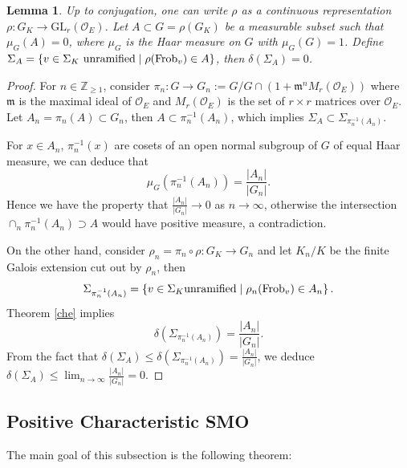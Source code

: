 \documentclass[20pt, oneside]{article}   	%
\newtheorem{lem}[thm]{Lemma}
\theoremstyle{definition}
\newcommand{\GL}{\mathrm{GL}}
\newcommand{\cO}{\mathcal{O}}
\begin{document}
\begin{lem}\label{lema}
Up to conjugation, one can write $\rho$ as a continuous representation $\rho:G_K\rightarrow \GL_r(\cO_E)$. Let $A\subset G=\rho(G_K)$ be a measurable subset such that $\mu_G(A)=0$, where $\mu_G$ is the Haar measure on $G$ with $\mu_G(G)=1$. Define $\Sigma_A=\left\{v\in\Sigma_K\ {\rm unramified }\mid \rho({\rm Frob}_v)\in A\right\}$, then $\delta(\Sigma_A)=0$.
\end{lem}
\begin{proof}

For $n\in \mathbb{Z}_{\geqslant 1}$, consider $\pi_n:G\rightarrow G_n:=G/G\cap (1+\mathfrak{m}^n M_r(\cO_E))$ where $\mathfrak{m}$ is the maximal ideal of $\cO_E$ and $M_r(\cO_E)$ is the set of $r\times r$ matrices over $\cO_E$. Let $A_n=\pi_n(A)\subset G_n$, then $A\subset\pi_n^{-1}(A_n)$, which implies $\Sigma_A\subset\Sigma_{\pi_n^{-1}(A_n)}$.

For $x\in A_n$, $\pi_n^{-1}(x)$ are cosets of an open normal subgroup of $G$ of equal Haar measure, we can deduce that $$\mu_G(\pi_n^{-1}(A_n))=\frac{|A_n|}{|G_n|}.$$ Hence we have the property that $\frac{|A_n|}{|G_n|}\rightarrow 0$ as $n\rightarrow \infty$, otherwise the intersection $\cap_n\pi_n^{-1}(A_n)\supset A$ would have positive measure, a contradiction.

On the other hand, consider $\rho_n=\pi_n\circ\rho:G_K\rightarrow G_n$ and let $K_n/K$ be the finite Galois extension cut out by $\rho_n$, then
$$\Sigma_{\pi_n^{-1}(A_n)}=\left\{v\in\Sigma_K {\rm unramified}\mid \rho_n({\rm Frob}_v)\in A_n \right\}.$$
Theorem \ref{che} implies $$\delta(\Sigma_{\pi_n^{-1}(A_n)})=\frac{|A_n|}{|G_n|}.$$
From the fact that $\delta(\Sigma_A)\leqslant \delta(\Sigma_{\pi_n^{-1}(A_n)})=\frac{|A_n|}{|G_n|}$, we deduce $\delta(\Sigma_A)\leqslant\lim_{n\rightarrow \infty}\frac{|A_n|}{|G_n|}=0$.

\end{proof}


\subsection{Positive Characteristic SMO}
The main goal of this subsection is the following theorem:
\end{document}
